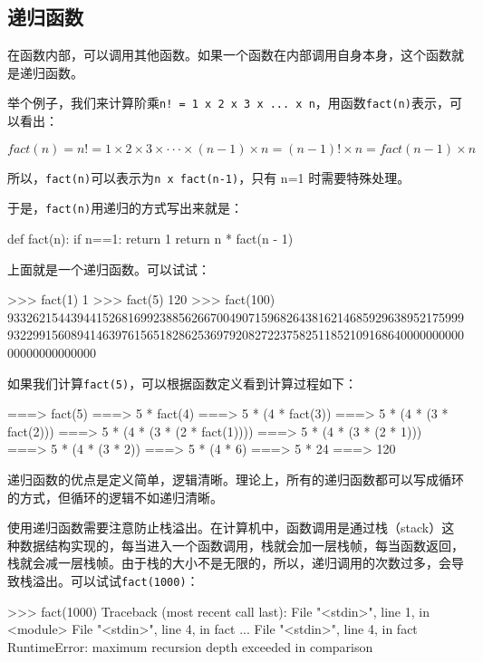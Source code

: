 \hypertarget{ux9012ux5f52ux51fdux6570}{%
\subsection{递归函数}\label{ux9012ux5f52ux51fdux6570}}

在函数内部，可以调用其他函数。如果一个函数在内部调用自身本身，这个函数就是递归函数。

举个例子，我们来计算阶乘\texttt{n!\ =\ 1\ x\ 2\ x\ 3\ x\ ...\ x\ n}，用函数\texttt{fact(n)}表示，可以看出：

\(fact(n)=n!=1\times2\times3\times\cdot\cdot\cdot\times(n-1)\times n=(n-1)!\times n=fact(n-1)\times n\)

所以，\texttt{fact(n)}可以表示为\texttt{n\ x\ fact(n-1)}，只有 n=1
时需要特殊处理。

于是，\texttt{fact(n)}用递归的方式写出来就是：

\begin{pythoncode}
def fact(n):
    if n==1:
        return 1
    return n * fact(n - 1)
\end{pythoncode}

上面就是一个递归函数。可以试试：

\begin{pythoncode}
>>> fact(1)
1
>>> fact(5)
120
>>> fact(100)
93326215443944152681699238856266700490715968264381621468592963895217599993229915608941463976156518286253697920827223758251185210916864000000000000000000000000
\end{pythoncode}

如果我们计算\texttt{fact(5)}，可以根据函数定义看到计算过程如下：

\begin{pythoncode}
===> fact(5)
===> 5 * fact(4)
===> 5 * (4 * fact(3))
===> 5 * (4 * (3 * fact(2)))
===> 5 * (4 * (3 * (2 * fact(1))))
===> 5 * (4 * (3 * (2 * 1)))
===> 5 * (4 * (3 * 2))
===> 5 * (4 * 6)
===> 5 * 24
===> 120
\end{pythoncode}

递归函数的优点是定义简单，逻辑清晰。理论上，所有的递归函数都可以写成循环的方式，但循环的逻辑不如递归清晰。

使用递归函数需要注意防止栈溢出。在计算机中，函数调用是通过栈（stack）这种数据结构实现的，每当进入一个函数调用，栈就会加一层栈帧，每当函数返回，栈就会减一层栈帧。由于栈的大小不是无限的，所以，递归调用的次数过多，会导致栈溢出。可以试试\texttt{fact(1000)}：

\begin{pythoncode}
>>> fact(1000)
Traceback (most recent call last):
  File "<stdin>", line 1, in <module>
  File "<stdin>", line 4, in fact
  ...
  File "<stdin>", line 4, in fact
RuntimeError: maximum recursion depth exceeded in comparison
\end{pythoncode}

